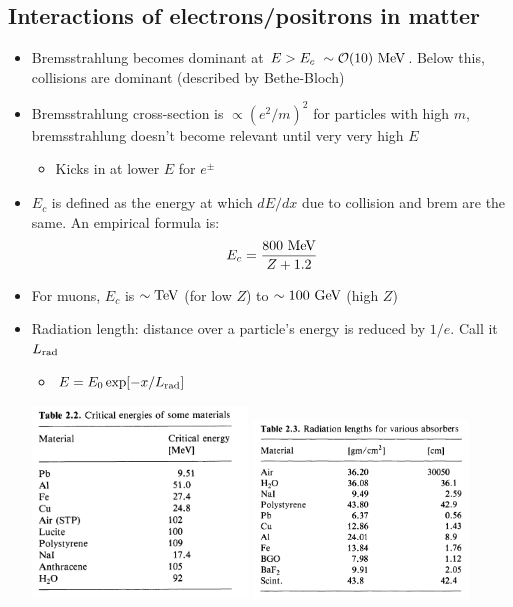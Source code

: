 \subsection{Interactions of electrons/positrons in matter}
\begin{itemize}
  \item Bremsstrahlung becomes dominant at $E>E_c~\sim\mathcal{O}(10)~\text{MeV}$. Below this, collisions are dominant (described by Bethe-Bloch)
  \item Bremsstrahlung cross-section is $\propto (e^2/m)^2$ \thus for particles with high $m$, bremsstrahlung doesn't become relevant until very very high $E$
  \begin{itemize}
    \item Kicks in at lower $E$ for $e^\pm$
  \end{itemize}
  \item $E_c$ is defined as the energy at which $dE/dx$ due to collision and brem are the same. An empirical formula is:
  \begin{equation}
    E_c = \frac{800~\text{MeV}}{Z+1.2}
  \end{equation}
  \item For muons, $E_c$ is $\sim \text{TeV}$ (for low $Z$) to $\sim 100~\text{GeV}$  (high $Z$)
  \item Radiation length: distance over a particle's energy is reduced by $1/e$. Call it $L_\text{rad}$
  \begin{itemize}
    \item $E=E_0 \exp[-x/L_\text{rad}]$
  \end{itemize}
  \begin{center}
    \includegraphics[width=0.45\textwidth,valign=t]{figs/ecrit_table.png}
    \includegraphics[width=0.45\textwidth,valign=t]{figs/radlength_table.png}\\

\end{center}
\end{itemize}
